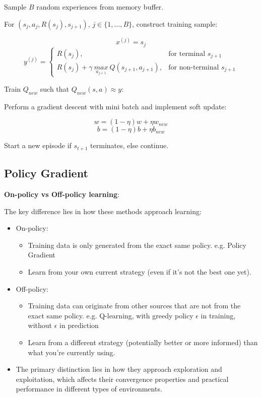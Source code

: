 \documentclass{article}
\begin{document}
\noindent \hspace{1cm} Sample \(B\) random experiences from memory buffer.

\noindent \hspace{1cm} For \((s_{j}, a_{j}, R(s_{j}), s_{j+1})\), \(j \in \{1, \dots, B\}\), construct training sample:

\[x^{(j)} = s_{j}\]
\[
y^{(j)} =
\begin{cases}
  R(s_{j}), & \text{for terminal } s_{j+1} \\
  R(s_{j}) + \gamma \ \underset{a_{j+1}}{max} \ Q(s_{j+1}, a_{j+1}), & \text{for non-terminal } s_{j+1}
\end{cases}
\]

\noindent \hspace{1cm} Train \(Q_{new}\) such that \(Q_{new}(s, a) \approx y\):

\noindent \hspace{1cm} Perform a gradient descent with mini batch and implement soft update:

\[w = (1 - \eta)w + \eta w_{new}\]
\[b = (1 - \eta)b + \eta b_{new}\]

\bigskip

\noindent \hspace{1cm} Start a new episode if \(s_{t+1}\) terminates, else continue.

\subsection{Policy Gradient}

\noindent \textbf{On-policy vs Off-policy learning}:

\noindent The key difference lies in how these methods approach learning:

\begin{itemize}
    \item On-policy:
    \begin{itemize}
        \item Training data is only generated from the exact same policy. e.g. Policy Gradient
        \item Learn from your own current strategy (even if it's not the best one yet).
    \end{itemize}
    \item Off-policy:
    \begin{itemize}
        \item Training data can originate from other sources that are not from the exact same policy. e.g. Q-learning, with greedy policy \(\epsilon\) in training, without \(\epsilon\) in prediction
        \item Learn from a different strategy (potentially better or more informed) than what you're currently using.
    \end{itemize}
    \item The primary distinction lies in how they approach exploration and exploitation, which affects their convergence properties and practical performance in different types of environments.
\end{itemize}
\end{document}
